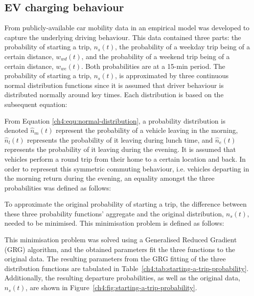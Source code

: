 \subsection{EV charging behaviour}
\label{ch4:subsec:ev-charging-behaviour}


From publicly-available car mobility data in \cite{Dallinger2012, MiD2008} an empirical model was developed to capture the underlying driving behaviour.
This data contained three parts: the probability of starting a trip, $n_{s}(t)$, the probability of a weekday trip being of a certain distance, $w_{wd}(t)$, and the probability of a weekend trip being of a certain distance, $w_{we}(t)$.
Both probabilities are at a 15-min period.
The probability of starting a trip, $n_{s}(t)$, is approximated by three continuous normal distribution functions since it is assumed that driver behaviour is distributed normally around key times.
Each distribution is based on the subsequent equation:



From Equation \ref{ch4:equ:normal-distribution}, a probability distribution is denoted $\hat{n}_{m}(t)$ represent the probability of a vehicle leaving in the morning, $\hat{n}_{l}(t)$ represents the probability of it leaving during lunch time, and $\hat{n}_{e}(t)$ represents the probability of it leaving during the evening.
It is assumed that vehicles perform a round trip from their home to a certain location and back.
In order to represent this symmetric commuting behaviour, i.e. vehicles departing in the morning return during the evening, an equality amongst the three probabilities was defined as follows:



To approximate the original probability of starting a trip, the difference between these three probability functions' aggregate and the original distribution, $n_s(t)$, needed to be minimised.
This minimisation problem is defined as follows:



This minimisation problem was solved using a Generalised Reduced Gradient (GRG) algorithm, and the obtained parameters fit the three functions to the original data.
The resulting parameters from the GRG fitting of the three distribution functions are tabulated in Table~\ref{ch4:tab:starting-a-trip-probability}.
Additionally, the resulting departure probabilities, as well as the original data, $n_s(t)$, are shown in Figure~\ref{ch4:fig:starting-a-trip-probability}.


